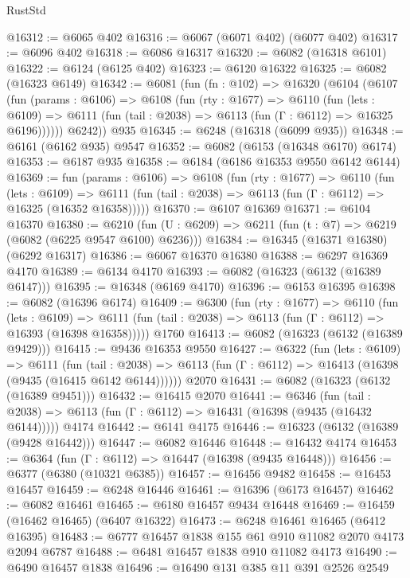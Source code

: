 \begin{lexlean}{RustStd}
\begin{coremodule}
@16312 := @6065 @402
@16316 := @6067 (@6071 @402) (@6077 @402)
@16317 := @6096 @402
@16318 := @6086 @16317
@16320 := @6082 (@16318 @6101)
@16322 := @6124 (@6125 @402)
@16323 := @6120 @16322
@16325 := @6082 (@16323 @6149)
@16342 := @6081
    (fun (fn : @102) =>
    @16320
      (@6104
        (@6107
          (fun (params : @6106) =>
          @6108
            (fun (rty : @1677) =>
            @6110
              (fun (lets : @6109) =>
              @6111 (fun (tail : @2038) => @6113 (fun (Γ : @6112) => @16325 @6196))))))
        @6242))
    @935
@16345 := @6248 (@16318 (@6099 @935))
@16348 := @6161 (@6162 @935) @9547
@16352 := @6082 (@6153 (@16348 @6170) @6174)
@16353 := @6187 @935
@16358 := @6184 (@6186 @16353 @9550 @6142 @6144)
@16369 := fun (params : @6106) =>
  @6108
    (fun (rty : @1677) =>
    @6110
      (fun (lets : @6109) =>
      @6111 (fun (tail : @2038) => @6113 (fun (Γ : @6112) => @16325 (@16352 @16358)))))
@16370 := @6107 @16369
@16371 := @6104 @16370
@16380 := @6210 (fun (U : @6209) => @6211 (fun (t : @7) => @6219 (@6082 (@6225 @9547 @6100) @6236)))
@16384 := @16345 (@16371 @16380) (@6292 @16317)
@16386 := @6067 @16370 @16380
@16388 := @6297 @16369 @4170
@16389 := @6134 @4170
@16393 := @6082 (@16323 (@6132 (@16389 @6147)))
@16395 := @16348 (@6169 @4170)
@16396 := @6153 @16395
@16398 := @6082 (@16396 @6174)
@16409 := @6300
    (fun (rty : @1677) =>
    @6110
      (fun (lets : @6109) =>
      @6111 (fun (tail : @2038) => @6113 (fun (Γ : @6112) => @16393 (@16398 @16358)))))
    @1760
@16413 := @6082 (@16323 (@6132 (@16389 @9429)))
@16415 := @9436 @16353 @9550
@16427 := @6322
    (fun (lets : @6109) =>
    @6111
      (fun (tail : @2038) =>
      @6113 (fun (Γ : @6112) => @16413 (@16398 (@9435 (@16415 @6142 @6144))))))
    @2070
@16431 := @6082 (@16323 (@6132 (@16389 @9451)))
@16432 := @16415 @2070
@16441 := @6346
    (fun (tail : @2038) => @6113 (fun (Γ : @6112) => @16431 (@16398 (@9435 (@16432 @6144)))))
    @4174
@16442 := @6141 @4175
@16446 := @16323 (@6132 (@16389 (@9428 @16442)))
@16447 := @6082 @16446
@16448 := @16432 @4174
@16453 := @6364 (fun (Γ : @6112) => @16447 (@16398 (@9435 @16448)))
@16456 := @6377 (@6380 (@10321 @6385))
@16457 := @16456 @9482
@16458 := @16453 @16457
@16459 := @6248 @16446
@16461 := @16396 (@6173 @16457)
@16462 := @6082 @16461
@16465 := @6180 @16457 @9434 @16448
@16469 := @16459 (@16462 @16465) (@6407 @16322)
@16473 := @6248 @16461 @16465 (@6412 @16395)
@16483 := @6777 @16457 @1838 @155 @61 @910 @11082 @2070 @4173 @2094 @6787
@16488 := @6481 @16457 @1838 @910 @11082 @4173
@16490 := @6490 @16457 @1838
@16496 := @16490 @131 @385 @11 @391 @2526 @2549

\end{coremodule}
\end{lexlean}
